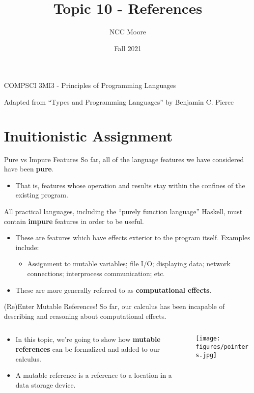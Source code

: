 \documentclass[11pt]{beamer}
\author{NCC Moore}
\title{Topic 10 - References}
\institute{McMaster University}
\date{Fall 2021}
\begin{document}
\begin{frame}
\center
COMPSCI 3MI3 - Principles of Programming Languages
\titlepage

Adapted from ``Types and Programming Languages'' by Benjamin C. Pierce 
\end{frame}

\begin{frame}
\tableofcontents
\end{frame}

\section[Intuitive]{Inuitionistic Assignment}
\begin{frame}[fragile=singleslide]{Pure vs Impure Features}
So far, all of the language features we have considered have been \textbf{pure}.
\begin{itemize}
\item That is, features whose operation and results stay within the confines of the existing program. 
\end{itemize}
All practical languages, including the ``purely function language'' Haskell, must contain \textbf{impure} features in order to be useful. 
\begin{itemize}
\item These are features which have effects exterior to the program itself.  Examples include:
\begin{itemize}
\item Assignment to mutable variables; file I/O; displaying data; network connections; interprocess communication; etc.
\end{itemize}
\item These are more generally referred to as \textbf{computational effects}.
\end{itemize}
\end{frame}


\begin{frame}[fragile=singleslide]{(Re)Enter Mutable References!}
So far, our calculus has been incapable of describing and reasoning about computational effects.

\begin{columns}
\begin{column}{0.5\textwidth}
\begin{itemize}
\item In this topic, we're going to show how \textbf{mutable references} can be formalized and added to our calculus.  
\item A mutable reference is a reference to a location in a data storage device.  
\end{itemize}  
\end{column}
\begin{column}{0.5\textwidth}
\texttt{[image: figures/pointers.jpg]}
\end{column}
\end{columns}
\end{frame}
\end{document}
